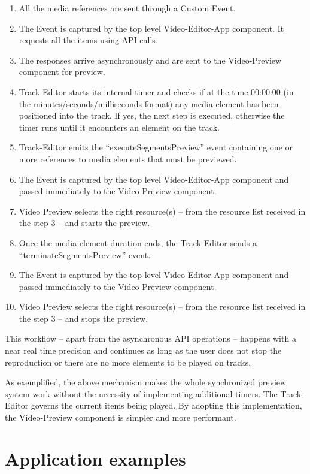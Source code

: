 \begin{enumerate}
  \item All the media references are sent through a Custom Event.
  \item The Event is captured by the top level Video-Editor-App component. It requests all the items using API calls.
  \item The responses arrive asynchronously and are sent to the Video-Preview component for preview.
  \item Track-Editor starts its internal timer and checks if at the time 00:00:00 (in the minutes/seconds/milliseconds format) any media element has been positioned into the track. If yes, the next step is executed, otherwise the timer runs until it encounters an element on the track.
  \item Track-Editor emits the “executeSegmentsPreview” event containing one or more references to media elements that must be previewed.
  \item The Event is captured by the top level Video-Editor-App component and passed immediately to the Video Preview component.
  \item Video Preview selects the right resource(s) – from the resource list received in the step 3 – and starts the preview.
  \item Once the media element duration ends, the Track-Editor sends a “terminateSegmentsPreview” event.
  \item The Event is captured by the top level Video-Editor-App component and passed immediately to the Video Preview component.
  \item Video Preview selects the right resource(s) – from the resource list received in the step 3 – and stops the preview.
\end{enumerate}

This workflow – apart from the asynchronous API operations – happens with a near real time precision and continues as long as the user does not stop the reproduction or there are no more elements to be played on tracks.

As exemplified, the above mechanism makes the whole synchronized preview system work without the necessity of implementing additional timers. The Track-Editor governs the current items being played. By adopting this implementation, the Video-Preview component is simpler and more performant.

\section{Application examples}
\label{sec:appExamples}

